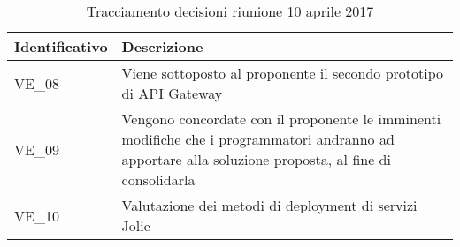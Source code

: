 \begin{table}[H]
	\begin{center}
		\begin{tabular}{|p{3cm}| p{11cm}|}
			\hline
			\textbf{Identificativo}	& \textbf{Descrizione} \\
			\hline
			VE\_08	& Viene sottoposto al proponente il secondo prototipo di API Gateway \\
			\hline
			VE\_09 & Vengono concordate con il proponente le imminenti modifiche che i programmatori andranno ad apportare alla soluzione proposta, al fine di consolidarla \\
			\hline
			VE\_10 & Valutazione dei metodi di deployment di servizi Jolie\\
			\hline
		\end{tabular}
		\caption{Tracciamento decisioni riunione 10 aprile 2017}
	\end{center}
\end{table}